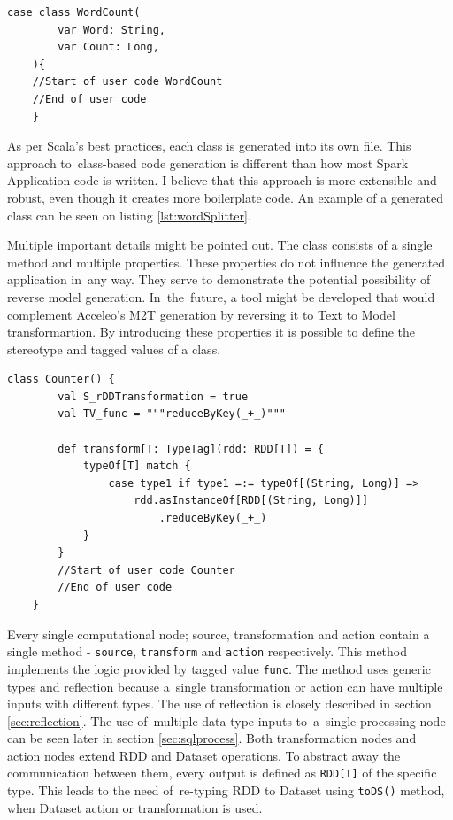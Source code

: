 \begin{lstlisting}[style=myScalastyle, caption={The generated Counter class}, label={lst:caseclass}]
    case class WordCount(
    	var Word: String,
    	var Count: Long,
    ){
    //Start of user code WordCount
    //End of user code
    }
\end{lstlisting}


As per Scala's best practices, each class is generated into its own file. This approach to~class-based code generation is different than how most Spark Application code is written. I believe that this approach is more extensible and robust, even though it creates more boilerplate code. An example of a generated class can be seen on listing \ref{lst:wordSplitter}.

Multiple important details might be pointed out. The class consists of a single method and multiple properties. These properties do not influence the generated application in~any way. They serve to demonstrate the potential possibility of reverse model generation. In~the~future, a tool might be developed that would complement Acceleo's M2T generation by reversing it to Text to Model transformartion. By introducing these properties it is possible to define the stereotype and tagged values of a class. 

\begin{lstlisting}[style=myScalastyle, caption={The generated Counter class}, label={lst:wordSplitter}]
    class Counter() {
    	val S_rDDTransformation = true
    	val TV_func = """reduceByKey(_+_)"""
    	
    	def transform[T: TypeTag](rdd: RDD[T]) = {
    		typeOf[T] match {
    			case type1 if type1 =:= typeOf[(String, Long)] =>
    				rdd.asInstanceOf[RDD[(String, Long)]]
    					.reduceByKey(_+_)
    		}
    	}
    	//Start of user code Counter
    	//End of user code
    }
\end{lstlisting}

Every single computational node; source, transformation and action contain a single method - \texttt{source}, \texttt{transform} and \texttt{action} respectively. This method implements the logic provided by tagged value \texttt{func}. The method uses generic types and reflection because a~single transformation or action can have multiple inputs with different types. The use of reflection is closely described in section \ref{sec:reflection}. The use of~multiple data type inputs to~a~single processing node can be seen later in section \ref{sec:sqlprocess}. Both transformation nodes and action nodes extend RDD and Dataset operations. To abstract away the communication between them, every output is defined as \texttt{RDD[T]} of the specific type. This leads to the need of~re-typing RDD to Dataset using \texttt{toDS()} method, when Dataset action or transformation is used.

